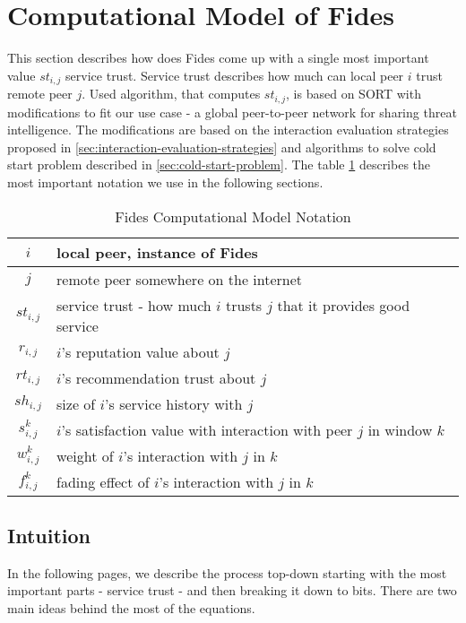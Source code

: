 \section{Computational Model of Fides}
\label{sec:computational-model}
This section describes how does Fides come up with a single most important value $st_{i,j}$ service trust. Service trust describes how much can local peer $i$ trust remote peer $j$.
Used algorithm, that computes $st_{i,j}$, is based on SORT\cite{sort} with modifications to fit our use case - a global peer-to-peer network for sharing threat intelligence. 
The modifications are based on the interaction evaluation strategies proposed in \ref{sec:interaction-evaluation-strategies} and algorithms to solve cold start problem described in \ref{sec:cold-start-problem}. The table \ref{tab:notation-computational-model} describes the most important notation we use in the following sections.

\begin{table}[ht]
\centering
\begin{tabular}{ c | m{20em} }
 $i$ & local peer, instance of Fides \\
 \hline
 $j$ & remote peer somewhere on the internet \\
 \hline
 $st_{i, j}$ & service trust - how much $i$ trusts $j$ that it provides good service \\
 \hline
 $r_{i, j}$ & $i$'s reputation value about $j$ \\
 \hline
 $rt_{i, j}$ & $i$'s recommendation trust about $j$ \\
 \hline
 $sh_{i, j}$ & size of $i$'s service history with $j$ \\
 \hline
 $s^{k}_{i, j}$ & $i$'s satisfaction value with interaction with peer $j$ in window $k$\\
 \hline
 $w^{k}_{i, j}$ & weight of $i$'s interaction with $j$ in $k$ \\
 \hline
 $f^{k}_{i, j}$ & fading effect of $i$'s interaction with $j$ in $k$ \\
\end{tabular}
\caption{Fides Computational Model Notation}
\label{tab:notation-computational-model}
\end{table}

\subsection{Intuition}
In the following pages, we describe the process top-down starting with the most important parts - service trust - and then breaking it down to bits.
There are two main ideas behind the most of the equations. 

